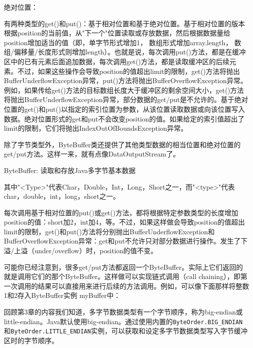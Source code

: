 		绝对位置： 

		

		有两种类型的get()和put()：基于相对位置和基于绝对位置。基于相对位置的版本根据position的当前值，从"下一个"位置读取或存放数据，然后根据数据量给position增加适当的值（即，单字节形式增加1， 数组形式增加array.length， 数组/偏移量/长度形式则增加length）。也就是说，每次调用put()方法，都是在缓冲区中的已有元素后面追加数据，每次调用get()方法，都是读取缓冲区的后续元素。不过，如果这些操作会导致position的值超出limit的限制，get()方法将抛出BufferUnderflowException异常，put()方法将抛出BufferOverflowException异常。例如，如果传给get()方法的目标数组长度大于缓冲区的剩余空间大小，get()方法将抛出BufferUnderflowException异常，部分数据的get/put是不允许的。基于绝对位置的get()和put()以指定的索引位置为参数，从该位置读取数据或向该位置写入数据。绝对位置形式的get和put不会改变position的值。如果给定的索引值超出了limit的限制，它们将抛出IndexOutOfBoundsException异常。 

		除了字节类型外，ByteBuffer类还提供了其他类型数据的相当位置和绝对位置的get/put方法。这样一来，就有点像DataOutputStream了。 

		ByteBuffer: 读取和存放Java多字节基本数据 

		

		其中"<Type>"代表Char，Double，Int，Long，Short之一，而"<type>"代表char，double，int，long，short之一。 

		每次调用基于相对位置的put()或get()方法，都将根据特定参数类型的长度增加position的值：short加2，int加4，等。不过，如果这样做会导致position的值超出limit的限制，get()和put()方法将分别抛出BufferUnderflowException和BufferOverflowException异常：get和put不允许只对部分数据进行操作。发生了下溢/上溢（under/overflow）时，position的值不变。 

		可能你已经注意到，很多get/put方法都返回一个ByteBuffer。实际上它们返回的就是调用它们的那个ByteBuffer。这样做可以实现链式调用（call chaining），即第一次调用的结果可以直接用来进行后续的方法调用。例如，可以像下面那样将整数1和2存入ByteBuffer实例 myBuffer中： 

		

		回顾第3章的内容我们知道，多字节数据类型有一个字节顺序，称为big-endian或little-endian。Java默认使用big-endian。通过使用内置的\verb|ByteOrder.BIG_ENDIAN|和\verb|ByteOrder.LITTLE_ENDIAN|实例，可以获取和设定多字节数据类型写入字节缓冲区时的字节顺序。 

